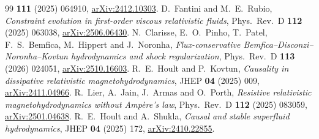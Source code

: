 \begin{thebibliography}{99}
\textbf{111} (2025) 064910,
\href{https://arxiv.org/abs/2412.10303}{arXiv:2412.10303}.
D.~Fantini and M.~E.~Rubio, \emph{Constraint evolution in first-order
viscous relativistic fluids}, Phys.\ Rev.\ D \textbf{112} (2025) 063038,
\href{https://arxiv.org/abs/2506.06430}{arXiv:2506.06430}.
N.~Clarisse, E.~O.~Pinho, T.~Patel, F.~S.~Bemfica, M.~Hippert and
J.~Noronha, \emph{Flux-conservative Bemfica--Disconzi--Noronha--Kovtun
hydrodynamics and shock regularization}, Phys.\ Rev.\ D
\textbf{113} (2026) 024051,
\href{https://arxiv.org/abs/2510.16603}{arXiv:2510.16603}.
R.~E.~Hoult and P.~Kovtun, \emph{Causality in dissipative relativistic
magnetohydrodynamics}, JHEP \textbf{04} (2025) 009,
\href{https://arxiv.org/abs/2411.04966}{arXiv:2411.04966}.
R.~Lier, A.~Jain, J.~Armas and O.~Porth, \emph{Resistive relativistic
magnetohydrodynamics without Amp\`ere's law}, Phys.\ Rev.\ D
\textbf{112} (2025) 083059,
\href{https://arxiv.org/abs/2501.04638}{arXiv:2501.04638}.
R.~E.~Hoult and A.~Shukla, \emph{Causal and stable superfluid
hydrodynamics}, JHEP \textbf{04} (2025) 172,
\href{https://arxiv.org/abs/2410.22855}{arXiv:2410.22855}.
\end{thebibliography}

